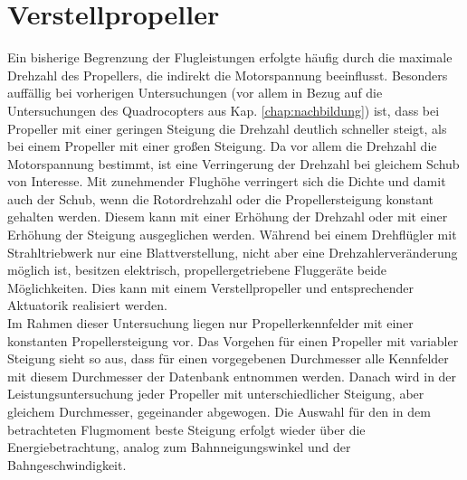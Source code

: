 \section{Verstellpropeller}
\label{sec:verstellprop}
Ein bisherige Begrenzung der Flugleistungen erfolgte häufig durch die maximale Drehzahl des Propellers, die indirekt die Motorspannung beeinflusst. 
Besonders auffällig bei vorherigen Untersuchungen (vor allem in Bezug auf die Untersuchungen des Quadrocopters aus Kap. \ref{chap:nachbildung}) ist, dass bei Propeller mit einer geringen Steigung die Drehzahl deutlich schneller steigt, als bei einem Propeller mit einer großen Steigung. Da vor allem die Drehzahl die Motorspannung bestimmt, ist eine Verringerung der Drehzahl bei gleichem Schub von Interesse. Mit zunehmender Flughöhe verringert sich die Dichte und damit auch der Schub, wenn die Rotordrehzahl oder die Propellersteigung konstant gehalten werden. Diesem kann mit einer Erhöhung der Drehzahl oder mit einer Erhöhung der Steigung ausgeglichen werden. Während bei einem Drehflügler mit Strahltriebwerk nur eine Blattverstellung, nicht aber eine Drehzahlerveränderung möglich ist, besitzen elektrisch, propellergetriebene Fluggeräte beide Möglichkeiten. Dies kann mit einem Verstellpropeller und entsprechender Aktuatorik realisiert werden. \\
Im Rahmen dieser Untersuchung liegen nur Propellerkennfelder mit einer konstanten Propellersteigung vor. Das Vorgehen für einen Propeller mit variabler Steigung sieht so aus, dass für einen vorgegebenen Durchmesser alle Kennfelder mit diesem Durchmesser der Datenbank entnommen werden. Danach wird in der Leistungsuntersuchung jeder Propeller mit unterschiedlicher Steigung, aber gleichem Durchmesser, gegeinander abgewogen. Die Auswahl für den in dem betrachteten Flugmoment beste Steigung erfolgt wieder über die Energiebetrachtung, analog zum Bahnneigungswinkel und der Bahngeschwindigkeit.


